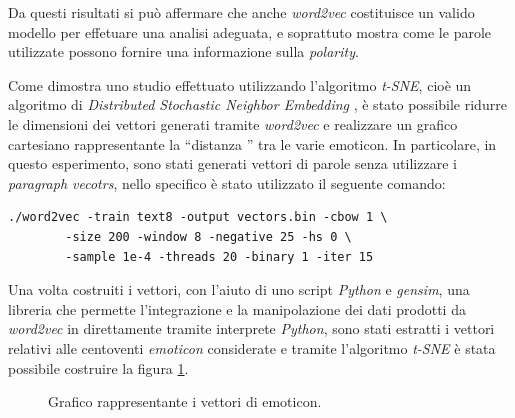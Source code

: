 \documentclass[a4paper,12pt,openright,twoside]{report}
\theoremstyle{definition}
\begin{document}
Da questi risultati si può affermare che anche \emph{word2vec} costituisce un valido modello
per effetuare una analisi adeguata, e soprattuto mostra come le parole utilizzate possono
fornire una informazione sulla \emph{polarity}.

Come dimostra uno studio effettuato utilizzando l'algoritmo
\emph{t-SNE}, cioè un algoritmo di \emph{Distributed Stochastic Neighbor Embedding }, è stato possibile
ridurre le dimensioni dei vettori generati tramite \emph{word2vec} e realizzare un grafico cartesiano rappresentante la ``distanza ''
tra le varie emoticon.
In particolare, in questo esperimento, sono stati generati vettori di parole senza utilizzare i \emph{paragraph vecotrs},
nello specifico è stato utilizzato il seguente comando:

\begin{verbatim}
./word2vec -train text8 -output vectors.bin -cbow 1 \
		-size 200 -window 8 -negative 25 -hs 0 \
		-sample 1e-4 -threads 20 -binary 1 -iter 15
\end{verbatim}

Una volta costruiti i vettori, con l'aiuto
di uno script \emph{Python} e \emph{gensim}, una libreria che permette l'integrazione e la manipolazione dei dati prodotti da \emph{word2vec} in 
direttamente tramite interprete \emph{Python}, sono stati estratti i vettori relativi alle centoventi \emph{emoticon} considerate e tramite l'algoritmo \emph{t-SNE}
è stata possibile costruire la figura \ref{fig:tSNE}.
\begin{figure}[H]
	\centering
	\caption{Grafico rappresentante i vettori di emoticon.}
	\label{fig:tSNE}
\end{figure}
\end{document}
